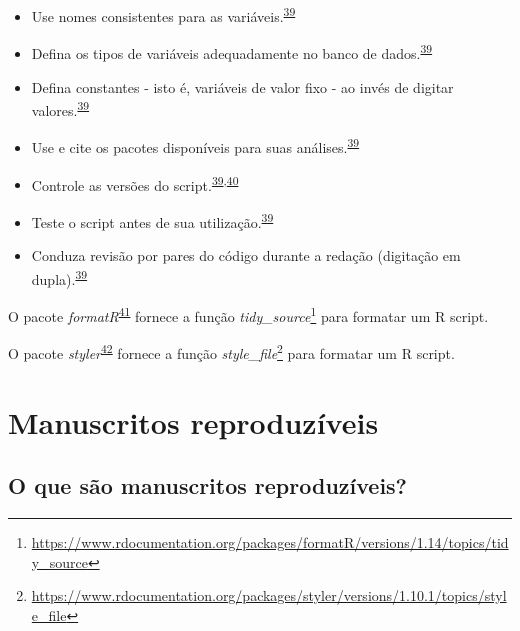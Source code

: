 \documentclass[
  a4paper,
]{book}
\renewcommand{\href}[2]{#2\footnote{\url{#1}}}
\newenvironment{infobox}[1]
  {
  \begin{itemize}
  \renewcommand{\labelitemi}{
    \raisebox{-.7\height}[0pt][0pt]{
      {\setkeys{Gin}{width=3em,keepaspectratio}
        \texttt{[image: \#1]}}
    }
  }
  \setlength{\fboxsep}{1em}
  \begin{blackbox}
  \item
  }
  {
  \end{blackbox}
  \end{itemize}
  }
\begin{document}
\begin{itemize}
\item
  Use nomes consistentes para as variáveis.\textsuperscript{\protect\hyperlink{ref-SchwabSimon2021}{39}}
\item
  Defina os tipos de variáveis adequadamente no banco de dados.\textsuperscript{\protect\hyperlink{ref-SchwabSimon2021}{39}}
\item
  Defina constantes - isto é, variáveis de valor fixo - ao invés de digitar valores.\textsuperscript{\protect\hyperlink{ref-SchwabSimon2021}{39}}
\item
  Use e cite os pacotes disponíveis para suas análises.\textsuperscript{\protect\hyperlink{ref-SchwabSimon2021}{39}}
\item
  Controle as versões do script.\textsuperscript{\protect\hyperlink{ref-SchwabSimon2021}{39},\protect\hyperlink{ref-Eglen2017}{40}}
\item
  Teste o script antes de sua utilização.\textsuperscript{\protect\hyperlink{ref-SchwabSimon2021}{39}}
\item
  Conduza revisão por pares do código durante a redação (digitação em dupla).\textsuperscript{\protect\hyperlink{ref-SchwabSimon2021}{39}}
\end{itemize}

\begin{infobox}{images/Rlogo}
O pacote \emph{formatR}\textsuperscript{\protect\hyperlink{ref-formatR}{41}} fornece a função \href{https://www.rdocumentation.org/packages/formatR/versions/1.14/topics/tidy_source}{\emph{tidy\_source}} para formatar um R script.

\end{infobox}

\begin{infobox}{images/Rlogo}
O pacote \emph{styler}\textsuperscript{\protect\hyperlink{ref-styler}{42}} fornece a função \href{https://www.rdocumentation.org/packages/styler/versions/1.10.1/topics/style_file}{\emph{style\_file}} para formatar um R script.

\end{infobox}

\hypertarget{relatuxf3rios-dinamicos}{%
\section{Manuscritos reproduzíveis}\label{relatuxf3rios-dinamicos}}

\hypertarget{o-que-suxe3o-manuscritos-reproduzuxedveis}{%
\subsection{O que são manuscritos reproduzíveis?}\label{o-que-suxe3o-manuscritos-reproduzuxedveis}}
\end{document}
